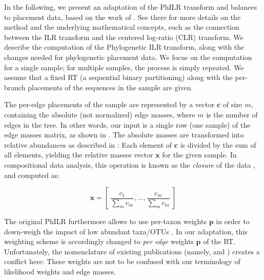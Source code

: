 
In the following, we present an adaptation of the PhILR transform and balances to placement data,
based on the work of .
See there for more details on the method and the underlying mathematical concepts,
such as the connection between the ILR transform and the centered log-ratio (CLR) transform.
We describe the computation of the Phylogenetic ILR transform,
along with the changes needed for phylogenetic placement data.
We focus on the computation for a single sample;
for multiple samples, the process is simply repeated.
We assume that a fixed \acf{RT} (a sequential binary partitioning)
along with the per-branch placements of the sequences in the sample are given.

The per-edge placements of the sample are represented by a vector $\bm{c}$ of size $m$, 
containing the absolute (not normalized) edge masses, where $m$ is the number of edges in the tree.
In other words, our input is a single row (one sample)
of the edge masses matrix, as shown in .
The absolute masses are transformed into relative abundances as described in %
:
Each element of $\bm{c}$ is divided by the sum of all elements,
yielding the relative masses vector $\bm{x}$ for the given sample.
In compositional data analysis, this operation is known as the \emph{closure} of the data \cite{Aitchison1986}, and computed as:

\begin{equation}
    \label{ch:Balances:sec:Methods:eq:Closure}
    \bm{x} = \left[~ \frac{c_1}{\sum_m c_m}, \dots, \frac{c_m}{\sum_m c_m} ~\right]
\end{equation}

The original PhILR furthermore allows to use per-taxon weights $\bm{p}$
in order to down-weigh the impact of low abundant taxa/OTUs \cite{Egozcue2016,Silverman2017}.
In our adaptation, this weighting scheme is accordingly changed to \emph{per edge} weights $\bm{p}$ of the \ac{RT}.
Unfortunately, the nomenclature of existing publications
(namely,  and ) creates a conflict here:
These weights are not to be confused with our terminology of likelihood weights and edge masses.

